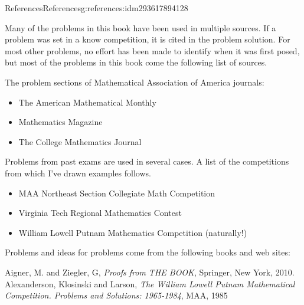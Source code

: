 \documentclass[twoside,10pt,]{book}
\numberwithin{equation}{section}
\providecommand\phantomsection{}
\begin{document}
%
\backmatter%
%
\clearpage\phantomsection%
%
%
%
\typeout{************************************************}
\typeout{************************************************}
%
\begin{references-chapter-numberless}{References}{}{References}{}{}{g:references:idm293617894128}
%
\begin{introduction}{}%
Many of the problems in this book have been used in multiple sources.  If  a problem was set in a know competition, it is cited in the problem solution.   For most other problems, no effort has been made to identify when it was first posed, but most of the problems in this book come the following list of sources.%
\par
The problem sections of  Mathematical Association of America journals:%
\begin{itemize}[label=\textbullet]
\item{}The American Mathematical Monthly%
\item{}Mathematics Magazine%
\item{}The College Mathematics Journal%
\end{itemize}
%
\par
Problems from past exams are used in several cases.  A list of the competitions from which I've drawn examples follows.%
\begin{itemize}[label=\textbullet]
\item{}MAA Northeast Section Collegiate Math Competition%
\item{}Virginia Tech Regional Mathematics Contest%
\item{}William Lowell Putnam Mathematics Competition (naturally!)%
\end{itemize}
%
\par
Problems and ideas for problems come from the following books and web sites:%
\end{introduction}%
\begin{referencelist}
\label{x:biblio:biblio-aigner}{}\hypertarget{x:biblio:biblio-aigner}{}Aigner, M. and Ziegler, G, \textit{Proofs from THE BOOK}, Springer, New York, 2010.
\label{x:biblio:biblio-putnam-2}{}\hypertarget{x:biblio:biblio-putnam-2}{}Alexanderson, Klosinski and Larson, \textit{The William Lowell Putnam Mathematical Competition. Problems and Solutions: 1965-1984}, MAA, 1985

\end{referencelist}
\end{references-chapter-numberless}
\end{document}
